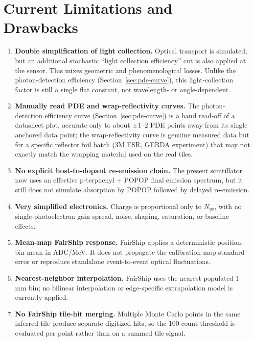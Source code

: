 \section{Current Limitations and Drawbacks}
\begin{enumerate}[label=\arabic*.]
\item \textbf{Double simplification of light collection.} Optical transport is simulated, but an additional stochastic ``light collection efficiency'' cut is also applied at the sensor. This mixes geometric and phenomenological losses. Unlike the photon-detection efficiency (Section~\ref{sec:pde-curve}), this light-collection factor is still a single flat constant, not wavelength- or angle-dependent.
\item \textbf{Manually read PDE and wrap-reflectivity curves.} The photon-detection efficiency curve (Section~\ref{sec:pde-curve}) is a hand read-off of a datasheet plot, accurate only to about $\pm1$--$2$ PDE points away from its single anchored data point; the wrap-reflectivity curve is genuine measured data but for a specific reflector foil batch (3M ESR, GERDA experiment) that may not exactly match the wrapping material used on the real tiles.
\item \textbf{No explicit host-to-dopant re-emission chain.} The present scintillator now uses an effective p-terphenyl + POPOP final emission spectrum, but it still does not simulate absorption by POPOP followed by delayed re-emission.
\item \textbf{Very simplified electronics.} Charge is proportional only to \(N_\mathrm{pe}\), with no single-photoelectron gain spread, noise, shaping, saturation, or baseline effects.
\item \textbf{Mean-map FairShip response.} FairShip applies a deterministic
position-bin mean in ADC/MeV.  It does not propagate the calibration-map
standard error or reproduce standalone event-to-event optical fluctuations.
\item \textbf{Nearest-neighbor interpolation.} FairShip uses the nearest
populated 1 mm bin; no bilinear interpolation or edge-specific extrapolation
model is currently applied.
\item \textbf{No FairShip tile-hit merging.} Multiple Monte Carlo points in the
same inferred tile produce separate digitized hits, so the 100-count threshold
is evaluated per point rather than on a summed tile signal.
\end{enumerate}

